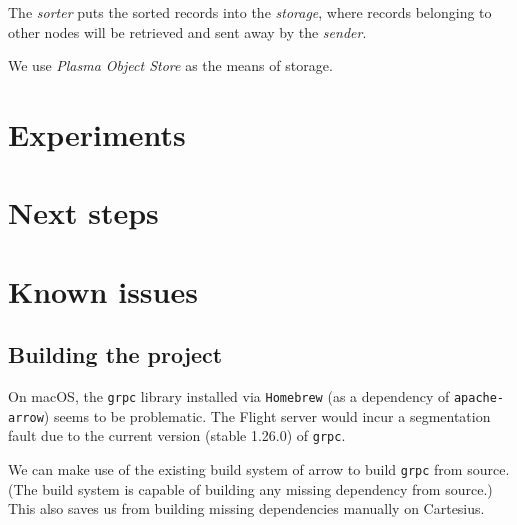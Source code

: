 \documentclass{article}
\begin{document}
The \textit{sorter} puts the sorted records into the \textit{storage}, where records belonging to other nodes will be retrieved and sent away by the \textit{sender}.

We use \textit{Plasma Object Store} as the means of storage.

\section{Experiments}

\section{Next steps}

\appendix
\section{Known issues}
\subsection{Building the project}

On macOS, the \texttt{grpc} library installed via \texttt{Homebrew} (as a dependency of \texttt{apache-arrow}) seems to be problematic.
The Flight server would incur a segmentation fault due to the current version (stable 1.26.0) of \texttt{grpc}.

We can make use of the existing build system of arrow to build \texttt{grpc} from source.
(The build system is capable of building any missing dependency from source.)
This also saves us from building missing dependencies manually on Cartesius.
\end{document}
